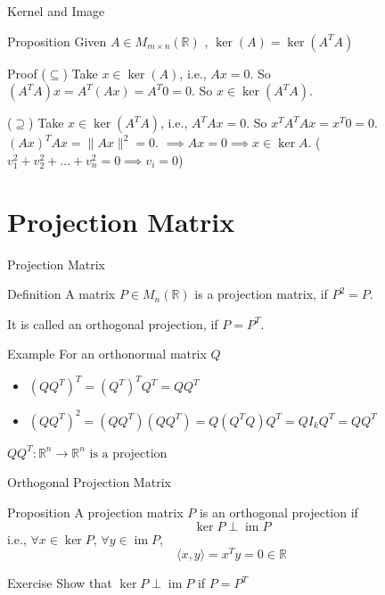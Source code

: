 \documentclass[aspectratio=169]{beamer}
\begin{document}
\begin{frame}{Kernel and Image}
    \begin{block}{Proposition}
        Given $A \in M_{m \times n}(\mathbb{R})$ , $\ker(A) = \ker(A^T A)$ 
    \end{block}
    \begin{block}{Proof}
        ($\subseteq$) Take $x \in \ker(A)$, i.e., $Ax=0$.
So $(A^T A)x = A^T(Ax) = A^T 0 = 0$.
So $x \in \ker(A^T A)$.

($\supseteq$) Take $x \in \ker(A^T A)$, i.e., $A^T Ax = 0$.
So $x^T A^T Ax = x^T 0 = 0$.
$(Ax)^T Ax = \|Ax\|^2 = 0$.
$\implies Ax = 0 \implies x \in \ker A$.
($v_1^2 + v_2^2 + \dots + v_n^2 = 0 \implies v_i = 0$)
    \end{block}
\end{frame}

\section{Projection Matrix}
\begin{frame}{Projection Matrix}
    \begin{block}{Definition}
        A matrix $P \in M_n(\mathbb{R})$ is a projection matrix, if $P^2=P$.
        
        It is called an orthogonal projection, if $P=P^T$.
    \end{block}
    \begin{block}{Example}
        For an orthonormal matrix $Q$
        \begin{itemize}
            \item $(QQ^T)^T = (Q^T)^T Q^T = Q Q^T$
            \item $(QQ^T)^2 = (QQ^T)(QQ^T) = Q(Q^T Q)Q^T = Q I_k Q^T = QQ^T$ 
        \end{itemize}
        $Q Q^T: \mathbb{R}^n \to \mathbb{R}^n \text{ is a projection}$
    \end{block}
\end{frame}
\begin{frame}{Orthogonal Projection Matrix}
    \begin{block}{Proposition}
        A projection matrix $P$ is an orthogonal projection if
$$ \ker P \perp \operatorname{im} P $$
i.e., $\forall x \in \ker P$, $\forall y \in \operatorname{im} P$,
$$ \langle x, y \rangle = x^T y = 0 \in \mathbb{R} $$
    \end{block}
    \begin{block}{Exercise}
    Show that $ \ker P \perp \operatorname{im} P $ if $P = P^T$
\end{block}    
\end{frame}
\end{document}
